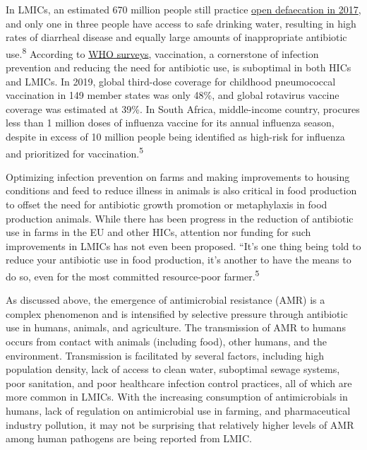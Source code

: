 \documentclass[
]{book}
\begin{document}
In LMICs, an estimated 670 million people still practice \href{https://blogs.worldbank.org/opendata/open-defeca\%20tion-nearly-halved-2000-still-practiced-670-million}{open defaecation in 2017}, and only one in three people have access to safe drinking water, resulting in high rates of diarrheal disease and equally large amounts of inappropriate antibiotic use.\textsuperscript{8} According to \href{https://www.who.int/news-room/\%20fact-sheets/detail/immunization-coverage.}{WHO surveys}, vaccination, a cornerstone of infection prevention and reducing the need for antibiotic use, is suboptimal in both HICs and LMICs. In 2019, global third-dose coverage for childhood pneumococcal vaccination in 149 member states was only 48\%, and global rotavirus vaccine coverage was estimated at 39\%. In South Africa, middle-income country, procures less than 1 million doses of influenza vaccine for its annual influenza season, despite in excess of 10 million people being identified as high-risk for influenza and prioritized for vaccination.\textsuperscript{5}

Optimizing infection prevention on farms and making improvements to housing conditions and feed to reduce illness in animals is also critical in food production to offset the need for antibiotic growth promotion or metaphylaxis in food production animals. While there has been progress in the reduction of antibiotic use in farms in the EU and other HICs, attention nor funding for such improvements in LMICs has not even been proposed. ``It's one thing being told to reduce your antibiotic use in food production, it's another to have the means to do so, even for the most committed resource-poor farmer.\textsuperscript{5}

As discussed above, the emergence of antimicrobial resistance (AMR) is a complex phenomenon and is intensified by selective pressure through antibiotic use in humans, animals, and agriculture. The transmission of AMR to humans occurs from contact with animals (including food), other humans, and the environment. Transmission is facilitated by several factors, including high population density, lack of access to clean water, suboptimal sewage systems, poor sanitation, and poor healthcare infection control practices, all of which are more common in LMICs. With the increasing consumption of antimicrobials in humans, lack of regulation on antimicrobial use in farming, and pharmaceutical industry pollution, it may not be surprising that relatively higher levels of AMR among human pathogens are being reported from LMIC.
\end{document}
